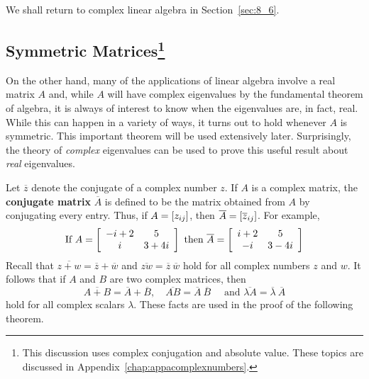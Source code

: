 \noindent We shall return to complex linear algebra in Section~\ref{sec:8_6}.

\subsection*{Symmetric Matrices\footnote{This discussion uses complex conjugation and absolute value. These topics are discussed in Appendix~\ref{chap:appacomplexnumbers}.}}

On the other hand, many of the applications of linear algebra involve a real matrix $A$ and, while $A$ will have complex eigenvalues by the fundamental theorem of algebra, it is always of interest to know when the eigenvalues are, in fact, real. While this can happen in a variety of ways, it turns out to hold whenever $A$ is symmetric. This important theorem will be used extensively later. Surprisingly, the theory of \textit{complex} eigenvalues can be used to prove this useful result about \textit{real} eigenvalues.

Let $\overline{z}$ denote the conjugate of a complex number $z$. If $A$ is a complex matrix, the \textbf{conjugate matrix} $\overline{A}$ is defined to be the matrix obtained from $A$ by conjugating every entry. Thus, if $A = \left[ z_{ij}\right]$, then $\overline{A} = \left[ \overline{z}_{ij} \right]$. For example,
\begin{equation*}
\mbox{If } A = 
\left[ \begin{array}{cc}
-i + 2 & 5 \\
i & 3 + 4i
\end{array} \right]
\mbox{ then }
\overline{A} = 
\left[ \begin{array}{cc}
i + 2 & 5 \\
-i & 3 - 4i
\end{array} \right]
\end{equation*}
Recall that $\overline{z + w} = \overline{z} + \overline{w}$ and $\overline{zw} = \overline{z}\ \overline{w}$ hold for all complex numbers $z$ and $w$. It follows that if $A$ and $B$ are two complex matrices, then
\begin{equation*}
\overline{A + B} = \overline{A} + \overline{B},\quad
\overline{AB} = \overline{A}\ \overline{B}\quad \mbox{ and }
\overline{\lambda A} = \overline{\lambda}\ \overline{A}
\end{equation*}
hold for all complex scalars $\lambda$. These facts are used in the proof of the following theorem.

